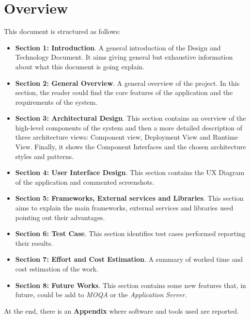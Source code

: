 \section{Overview}
This document is structured as follows:
\begin{itemize}
  \setlength{\itemindent}{-.4in}
  \item[] \textbf{Section 1: Introduction}. A general introduction of the Design and Technology Document. It aims giving general but exhaustive information about what this document is going explain.
  
  \item[] \textbf{Section 2: General Overview}. A general overview of the project. In this section, the reader could find the core features of the application and the requirements of the system.
  
  \item[] \textbf{Section 3: Architectural Design}. This section contains an overview of the high-level components of the system and then a more detailed description of three architecture views: Component view, Deployment View and Runtime View. Finally, it shows the Component Interfaces and the chosen architecture styles and patterns.
  
  \item[] \textbf{Section 4: User Interface Design}. This section contains the UX Diagram of the application and commented screenshots.
  
  \item[] \textbf{Section 5: Frameworks, External services and Libraries}. This section aims to explain the main frameworks, external services and libraries used pointing out their advantages.
  
  \item[] \textbf{Section 6: Test Case}. This section identifies test cases performed reporting their results.
  
  \item[] \textbf{Section 7: Effort and Cost Estimation}. A summary of worked time and cost estimation of the work.
  
  \item[] \textbf{Section 8: Future Works}. This section contains some new features that, in future, could be add to \textit{MOQA} or the \textit{Application Server}.
\end{itemize}

At the end, there is an \textbf{Appendix} where software and tools used are reported.